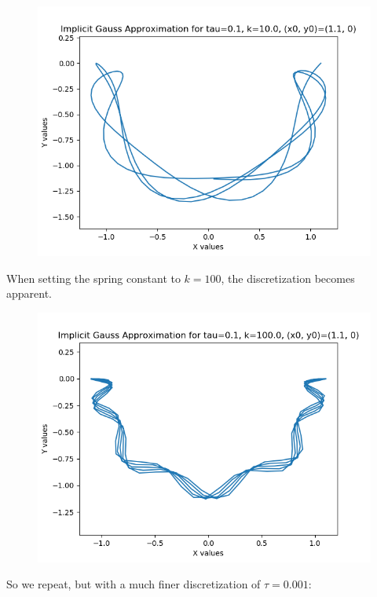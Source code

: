 \documentclass{article}
\theoremstyle{definition}
\begin{document}
\begin{itemize}
\begin{figure}[H]
			\includegraphics[scale=0.6]{gauss_spring_01_10}
		\end{figure}
		When setting the spring constant to $k=100$, the
		discretization becomes apparent.
		\begin{figure}[H]
			\includegraphics[scale=0.6]{gauss_spring_01_100}
		\end{figure}
		So we repeat, but with a much finer discretization of
		$\tau=0.001$:
		\begin{figure}[H]

\end{figure}
\end{itemize}
\end{document}
